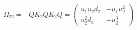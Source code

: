\begin{equation}
\Omega_{22}= -Q K_2 Q K_2 Q = \left(  \begin{array}{cc}
u_1 u_2 d_2  & -u_1 u_2^2 \\
u_2^2 d_2  & -u_2^3
\end{array}  \right)
\end{equation}

